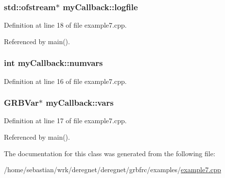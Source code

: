 \subsubsection[{\texorpdfstring{logfile}{logfile}}]{\setlength{\rightskip}{0pt plus 5cm}std\+::ofstream$\ast$ my\+Callback\+::logfile}\hypertarget{classmyCallback_a6dbb332a87adc69a20b79d9185518adc}{}\label{classmyCallback_a6dbb332a87adc69a20b79d9185518adc}


Definition at line 18 of file example7.\+cpp.



Referenced by main().

\subsubsection[{\texorpdfstring{numvars}{numvars}}]{\setlength{\rightskip}{0pt plus 5cm}int my\+Callback\+::numvars}\hypertarget{classmyCallback_a4093ee09300c254ac977ad61f861f21f}{}\label{classmyCallback_a4093ee09300c254ac977ad61f861f21f}


Definition at line 16 of file example7.\+cpp.

\subsubsection[{\texorpdfstring{vars}{vars}}]{\setlength{\rightskip}{0pt plus 5cm}G\+R\+B\+Var$\ast$ my\+Callback\+::vars}\hypertarget{classmyCallback_a5e9e8c33c9ed51920ee430230a91a744}{}\label{classmyCallback_a5e9e8c33c9ed51920ee430230a91a744}


Definition at line 17 of file example7.\+cpp.



Referenced by main().



The documentation for this class was generated from the following file\+:\begin{DoxyCompactItemize}
\item 
/home/sebastian/wrk/deregnet/deregnet/grbfrc/examples/\hyperlink{example7_8cpp}{example7.\+cpp}\end{DoxyCompactItemize}
